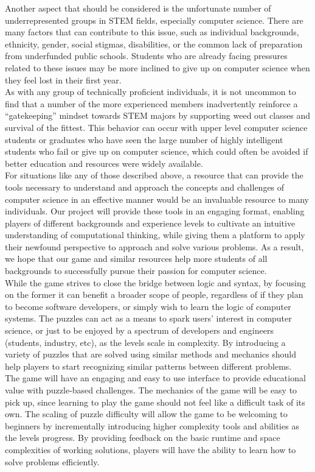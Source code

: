Another aspect that should be considered is the unfortunate number of
underrepresented groups in STEM fields, especially computer science. There are
many factors that can contribute to this issue, such as individual backgrounds,
ethnicity, gender, social stigmas, disabilities, or the common lack of
preparation from underfunded public schools. Students who are already facing
pressures related to these issues may be more inclined to give up on computer
science when they feel lost in their first year.\\

As with any group of technically proficient individuals, it is not uncommon to
find that a number of the more experienced members inadvertently reinforce a
“gatekeeping” mindset towards STEM majors by supporting weed out classes and
survival of the fittest. This behavior can occur with upper level computer
science students or graduates who have seen the large number of highly
intelligent students who fail or give up on computer science, which could often
be avoided if better education and resources were widely available.\\

For situations like any of those described above, a resource that can provide
the tools necessary to understand and approach the concepts and challenges of
computer science in an effective manner would be an invaluable resource to many
individuals. Our project will provide these tools in an engaging format,
enabling players of different backgrounds and experience levels to cultivate an
intuitive understanding of computational thinking, while giving them a platform
to apply their newfound perspective to approach and solve various problems. As a
result, we hope that our game and similar resources help more students of all
backgrounds to successfully pursue their passion for computer science.\\

While the game strives to close the bridge between logic and syntax, by focusing
on the former it can benefit a broader scope of people, regardless of if they
plan to become software developers, or simply wish to learn the logic of
computer systems. The puzzles can act as a means to spark users’ interest in
computer science, or just to be enjoyed by a spectrum of developers and
engineers (students, industry, etc), as the levels scale in complexity. By
introducing a variety of puzzles that are solved using similar methods and
mechanics should help players to start recognizing similar patterns between
different problems.\\

The game will have an engaging and easy to use interface to provide educational
value with puzzle-based challenges. The mechanics of the game will be easy to
pick up, since learning to play the game should not feel like a difficult task
of its own. The scaling of puzzle difficulty will allow the game to be welcoming
to beginners by incrementally introducing higher complexity tools and abilities
as the levels progress. By providing feedback on the basic runtime and space
complexities of working solutions, players will have the ability to learn how to
solve problems efficiently.\\

